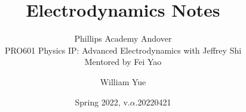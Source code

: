 \documentclass[11pt, oneside]{scrbook}
\begin{document}
\title{Electrodynamics Notes}
\subtitle{Phillips Academy Andover\\
PRO601 Physics IP: Advanced Electrodynamics with Jeffrey Shi\\
Mentored by Fei Yao}
\author{William Yue}
\date{Spring 2022, v.$\alpha$.20220421}
\maketitle



\tableofcontents




\end{document}
